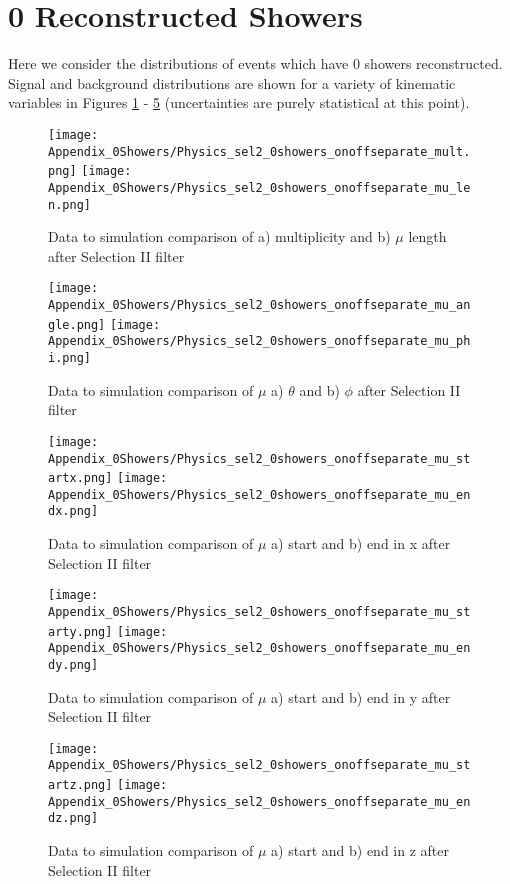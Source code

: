 \clearpage
\appendix
\clearpage

\section{0 Reconstructed Showers}
\label{sec:AppC}
Here we consider the distributions of events which have 0 showers reconstructed. Signal and background distributions are shown for a variety of kinematic variables in Figures \ref{fig:physics_sel2_0shower_mulen} - \ref{fig:physics_sel2_0shower_z} (uncertainties are purely statistical at this point). 

\begin{figure}[h!]
\centering
\texttt{[image: Appendix\_0Showers/Physics\_sel2\_0showers\_onoffseparate\_mult.png]}
\hspace{2 mm}
\texttt{[image: Appendix\_0Showers/Physics\_sel2\_0showers\_onoffseparate\_mu\_len.png]}
\caption{ Data to simulation comparison of a) multiplicity and b) $\mu$ length after Selection II filter }
\label{fig:physics_sel2_0shower_mulen}
\end{figure}

\begin{figure}[h!]
\centering
\texttt{[image: Appendix\_0Showers/Physics\_sel2\_0showers\_onoffseparate\_mu\_angle.png]}
\hspace{2 mm}
\texttt{[image: Appendix\_0Showers/Physics\_sel2\_0showers\_onoffseparate\_mu\_phi.png]}
\caption{ Data to simulation comparison of $\mu$ a) $\theta$  and b) $\phi$ after Selection II filter }
\label{fig:physics_sel2_0shower_muphi}
\end{figure}

\begin{figure}[h!]
\centering
\texttt{[image: Appendix\_0Showers/Physics\_sel2\_0showers\_onoffseparate\_mu\_startx.png]}
\texttt{[image: Appendix\_0Showers/Physics\_sel2\_0showers\_onoffseparate\_mu\_endx.png]}
\caption{ Data to simulation comparison of $\mu$ a) start and b) end in x after Selection II filter }
\label{fig:physics_sel2_0shower_x}
\end{figure}

\begin{figure}[h!]
\centering
\texttt{[image: Appendix\_0Showers/Physics\_sel2\_0showers\_onoffseparate\_mu\_starty.png]}
\texttt{[image: Appendix\_0Showers/Physics\_sel2\_0showers\_onoffseparate\_mu\_endy.png]}
\caption{ Data to simulation comparison of $\mu$ a) start and b) end in y after Selection II filter }
\label{fig:physics_sel2_0shower_y}
\end{figure}

\begin{figure}[h!]
\centering
\texttt{[image: Appendix\_0Showers/Physics\_sel2\_0showers\_onoffseparate\_mu\_startz.png]}
\texttt{[image: Appendix\_0Showers/Physics\_sel2\_0showers\_onoffseparate\_mu\_endz.png]}
\caption{ Data to simulation comparison of $\mu$ a) start and b) end in z after Selection II filter }
\label{fig:physics_sel2_0shower_z}
\end{figure}
